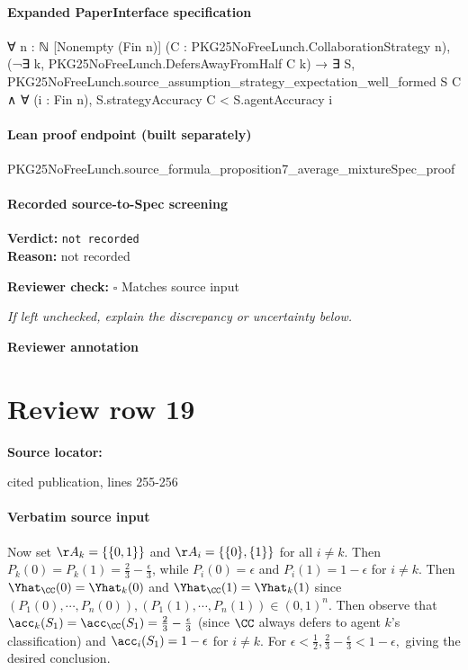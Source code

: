 \documentclass[10pt]{article}
\newcommand{\reviewerbox}{%
  \par\noindent\fbox{\parbox{0.96\linewidth}{\rule{0pt}{0.38in}}}\par
}
\newcommand{\reviewmatch}[1]{%
  \par\noindent\textbf{Reviewer check:} $\square$\; #1\par
  \noindent\emph{If left unchecked, explain the discrepancy or uncertainty below.}\par
}
\begin{document}
\paragraph{Expanded PaperInterface specification}
\begin{ReviewVerbatim}
∀ {n : ℕ} [Nonempty (Fin n)] (C : PKG25NoFreeLunch.CollaborationStrategy n),
  (¬∃ k, PKG25NoFreeLunch.DefersAwayFromHalf C k) →
    ∃ S,
      PKG25NoFreeLunch.source_assumption_strategy_expectation_well_formed S C ∧
        ∀ (i : Fin n), S.strategyAccuracy C < S.agentAccuracy i
\end{ReviewVerbatim}

\paragraph{Lean proof endpoint (built separately)}\begin{ReviewVerbatim}
PKG25NoFreeLunch.source_formula_proposition7_average_mixtureSpec_proof
\end{ReviewVerbatim}

\paragraph{Recorded source-to-Spec screening}
\textbf{Verdict:} \texttt{not recorded}
\\
\textbf{Reason:} not recorded
\reviewmatch{Matches source input}
\noindent\textbf{Reviewer annotation}\par
\reviewerbox
\clearpage
\hypertarget{source-claim-2c1cc7b2a1433aaa}{}
\section*{Review row 19}
\textbf{Source locator:} {\footnotesize\raggedright cited publication, lines 255-\allowbreak{}256\par}
\paragraph{Verbatim source input}
\begin{ReviewVerbatim}
Now set $\AA_k = \{\{0,1\}\}$ and $\AA_i = \{\{0\}, \{1\}\}$ for all $i\neq k.$ Then $P_k(0)=P_k(1)=\frac{2}{3} - \frac{\epsilon}{3}$, while $P_i(0)=\epsilon$ and $P_i(1)=1-\epsilon$ for $i\neq k.$ Then $\Yhat_\CC(0) = \Yhat_k(0)$ and $\Yhat_\CC(1) = \Yhat_k(1)$ since $(P_1(0), \cdots, P_n(0)), (P_1(1), \cdots, P_n(1))\in (0,1)^n.$
Then observe that $\acc_k(S_1)=\acc_\CC(S_1)=\frac{2}{3}-\frac{\epsilon}{3}$ (since $\CC$ always defers to agent $k$'s classification) and $\acc_i(S_1)=1 - \epsilon$ for $i\neq k$. For $\epsilon < \frac{1}{2}, \frac{2}{3}-\frac{\epsilon}{3} < 1 - \epsilon,$ giving the desired conclusion.
\end{ReviewVerbatim}
\end{document}
